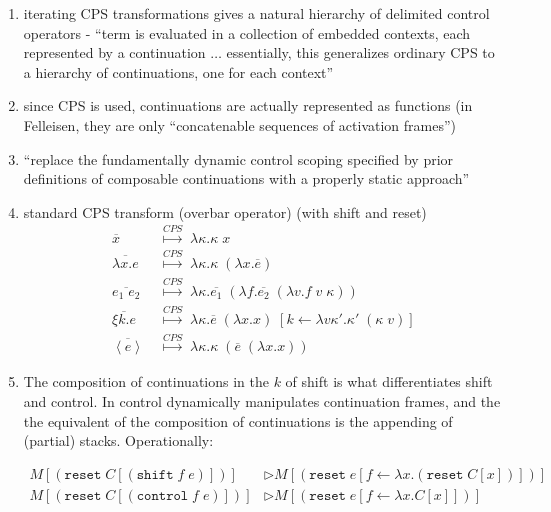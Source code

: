 \documentclass[letterpaper]{llncs}
\newcommand{\labeledstep}[1]{ \ensuremath{ \stackrel{#1}{\longmapsto} } }
\newcommand{\app}[2]{ \ensuremath{ #1 \; #2 } }
\newcommand{\appp}[2]{ \ensuremath{ (\app{#1}{#2}) } }
\newcommand{\lam}[2]{ \ensuremath{ \lambda #1.#2 } }
\newcommand{\lamp}[2]{ \ensuremath{ (\lam{#1}{#2}) } }
\newcommand{\inhole}[2]{ \ensuremath{ #1[#2] } }
\newcommand{\createop}[1]{\texttt{#1}\xspace}
\newcommand{\ctrl}{\createop{control}}
\newcommand{\resettxt}[1]{ \ensuremath{ (\createop{reset} \; #1) } }
\newcommand{\shifttxt}[2]{ \ensuremath{ (\createop{shift} \; #1 \; #2) } }
\newcommand{\ctrltxt}[2]{ \ensuremath{ (\ctrl \; #1 \; #2) } }
\newcommand{\CPSstep}{ \ensuremath{ \; \labeledstep{CPS} \; } }
\newcommand{\cps}[1]{ \ensuremath{ \lam{\kappa}{#1} } }
\newcommand{\cpstrans}[1]{ \ensuremath{ \overline{#1} } }
\newcommand{\shift}[2]{ \ensuremath{ \xi #1.#2 } }
\newcommand{\reset}[1]{ \ensuremath{ \left\langle #1 \right\rangle } }
\newcommand{\idcont}{ \ensuremath{ \lamp{x}{x} } }
\begin{document}
\begin{enumerate}
	\item iterating CPS transformations gives a natural hierarchy of delimited control operators - ``term is evaluated in a collection of embedded contexts, each represented by a continuation $\ldots$ essentially, this generalizes ordinary CPS to a hierarchy of continuations, one for each context''
	\item since CPS is used, continuations are actually represented as functions (in Felleisen, they are only ``concatenable sequences of activation frames'')
	\item ``replace the fundamentally dynamic control scoping specified by prior definitions of composable continuations with a properly static approach''
	
	\item standard CPS transform (overbar operator) (with shift and reset) 
\begin{align*}
\cpstrans{x}
  &\CPSstep 
\cps{ \app{\kappa}{x} } \\
\cpstrans{\lam{x}{e}}
  &\CPSstep 
\cps{ \app{\kappa}{\lamp{x}{\cpstrans{e}}} } \\
\cpstrans{\app{e_1}{e_2}} 
  &\CPSstep 
\cps{ \app{ \cpstrans{e_1} }
          { \lamp{f}{ \app{ \cpstrans{e_2} }
                          { \lamp{v}{ \app{f}{\app{v}{\kappa}} } } } } } \\
\cpstrans{\shift{k}{e}}
  &\CPSstep
\cps{ \app{ \app{ \cpstrans{e} }{ \idcont } }
          { [k \leftarrow \lam{v\kappa'}{\app{\kappa'}
                                                     {\appp{\kappa}{v}}}] } } \\
\cpstrans{\reset{e}}
  &\CPSstep
\cps{ \app{ \kappa }{ \appp{ \cpstrans{e} }
                           { \idcont } } }
\end{align*}

	\item The composition of continuations in the $k$ of shift is what differentiates shift and control. In control dynamically manipulates continuation frames, and the the equivalent of the composition of continuations is the appending of (partial) stacks. Operationally:
	
\begin{align*}
\inhole{ M }{ \resettxt{ \inhole{C}{\shifttxt{f}{e}} } } &\triangleright
\inhole{ M }{ \resettxt{ e[f \leftarrow \lam{x}{\resettxt{\inhole{C}{x}}}]} } \\
\inhole{ M }{ \resettxt{ \inhole{C}{\ctrltxt{f}{e}} } } &\triangleright
\inhole{ M }{ \resettxt{ e[f \leftarrow \lam{x}{\inhole{C}{x}}]} } \\
\end{align*}


\end{enumerate}
\end{document}
